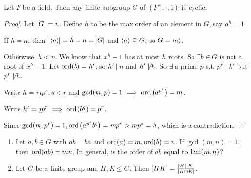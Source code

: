 \begin{theorem}
  Let $F$ be a field. Then any finite subgroup $G$ of $(F^\times, \cdot, 1)$
  is cyclic.

  \begin{proof}
    Let $\lvert G\rvert = n$. Define $h$ to be the max order of an element in $G$,
    say $a^h = 1$.

    If $h = n$, then $\lvert\langle a\rangle\rvert = h = n = \lvert G\rvert$ and $\langle a\rangle \subseteq G$,
    so $G = \langle a\rangle$.

    Otherwise, $h < n$. We know that $x^h - 1$ has at most $h$ roots.
    So $\exists b \in G$ is not a root of $x^h - 1$.
    Let $\operatorname{ord}(b) = h'$, so $h' \mid n$ and $h' \not\mid h$.
    So $\exists$ a prime $p$ s.t. $p^r \mid h'$ but $p^r \not\mid h$.

    Write $h = mp^s, s < r$ and $\gcd(m, p) = 1 \implies
    \operatorname{ord} \left( a^{p^s} \right) = m$.

    Write $h' = qp^r \implies \operatorname{ord} \left( b^q \right) = p^r$.

    Since $\gcd(m, p^r) = 1, \operatorname{ord}\left(a^{p^s} b^q \right) = mp^r > mp^s = h$,
    which is a contradiction.
  \end{proof}
\end{theorem}

\begin{exercise} \mbox{}
  \begin{enumerate}
    \item Let $a, b \in G$ with $ab = ba$ and $\operatorname{ord}(a) = m, \operatorname{ord}(b) = n$.
      If $\gcd(m, n) = 1$, then $\operatorname{ord}(ab) = mn$.
      In general, is the order of $ab$ equal to $\operatorname{lcm}(m, n)$?
    \item Let $G$ be a finite group and $H, K \le G$. Then
      $\lvert HK\rvert = \frac{\lvert H\rvert\lvert K\rvert}{\lvert H \cap K\rvert}$.
  \end{enumerate}
\end{exercise}
